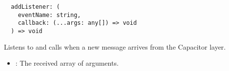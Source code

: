 \begin{verbatim}
  addListener: (
    eventName: string,
    callback: (...args: any[]) => void
  ) => void
\end{verbatim}

Listens to  and calls  when a new message arrives from the Capacitor layer.

\begin{itemize}
  \setlength\itemsep{-0.8em}
  \item {}: The received array of arguments.
\end{itemize}

